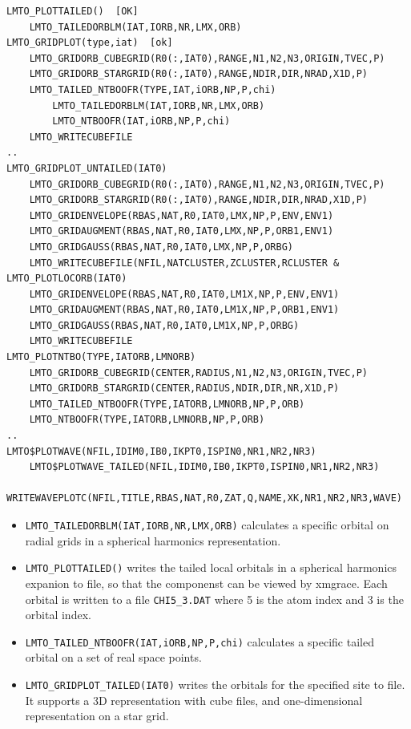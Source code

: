 \documentclass[11pt,a4paper]{report}
\begin{document}
\begin{verbatim}
LMTO_PLOTTAILED()  [OK]
    LMTO_TAILEDORBLM(IAT,IORB,NR,LMX,ORB)
LMTO_GRIDPLOT(type,iat)  [ok]
    LMTO_GRIDORB_CUBEGRID(R0(:,IAT0),RANGE,N1,N2,N3,ORIGIN,TVEC,P)
    LMTO_GRIDORB_STARGRID(R0(:,IAT0),RANGE,NDIR,DIR,NRAD,X1D,P)
    LMTO_TAILED_NTBOOFR(TYPE,IAT,iORB,NP,P,chi)
        LMTO_TAILEDORBLM(IAT,IORB,NR,LMX,ORB)
        LMTO_NTBOOFR(IAT,iORB,NP,P,chi)
    LMTO_WRITECUBEFILE
..
LMTO_GRIDPLOT_UNTAILED(IAT0)
    LMTO_GRIDORB_CUBEGRID(R0(:,IAT0),RANGE,N1,N2,N3,ORIGIN,TVEC,P)
    LMTO_GRIDORB_STARGRID(R0(:,IAT0),RANGE,NDIR,DIR,NRAD,X1D,P)
    LMTO_GRIDENVELOPE(RBAS,NAT,R0,IAT0,LMX,NP,P,ENV,ENV1)
    LMTO_GRIDAUGMENT(RBAS,NAT,R0,IAT0,LMX,NP,P,ORB1,ENV1)
    LMTO_GRIDGAUSS(RBAS,NAT,R0,IAT0,LMX,NP,P,ORBG)
    LMTO_WRITECUBEFILE(NFIL,NATCLUSTER,ZCLUSTER,RCLUSTER &
LMTO_PLOTLOCORB(IAT0)
    LMTO_GRIDENVELOPE(RBAS,NAT,R0,IAT0,LM1X,NP,P,ENV,ENV1)
    LMTO_GRIDAUGMENT(RBAS,NAT,R0,IAT0,LM1X,NP,P,ORB1,ENV1)
    LMTO_GRIDGAUSS(RBAS,NAT,R0,IAT0,LM1X,NP,P,ORBG)
    LMTO_WRITECUBEFILE
LMTO_PLOTNTBO(TYPE,IATORB,LMNORB)
    LMTO_GRIDORB_CUBEGRID(CENTER,RADIUS,N1,N2,N3,ORIGIN,TVEC,P)
    LMTO_GRIDORB_STARGRID(CENTER,RADIUS,NDIR,DIR,NR,X1D,P)
    LMTO_TAILED_NTBOOFR(TYPE,IATORB,LMNORB,NP,P,ORB)
    LMTO_NTBOOFR(TYPE,IATORB,LMNORB,NP,P,ORB)
..
LMTO$PLOTWAVE(NFIL,IDIM0,IB0,IKPT0,ISPIN0,NR1,NR2,NR3)
    LMTO$PLOTWAVE_TAILED(NFIL,IDIM0,IB0,IKPT0,ISPIN0,NR1,NR2,NR3)
        WRITEWAVEPLOTC(NFIL,TITLE,RBAS,NAT,R0,ZAT,Q,NAME,XK,NR1,NR2,NR3,WAVE)
\end{verbatim}






\begin{itemize}
\item \verb|LMTO_TAILEDORBLM(IAT,IORB,NR,LMX,ORB)| calculates a
  specific orbital on radial grids in a spherical harmonics
  representation.
%
\item \verb|LMTO_PLOTTAILED()| writes the tailed local orbitals in a
  spherical harmonics expanion to file, so that the componenst can be
  viewed by xmgrace. Each orbital is written to a file \verb|CHI5_3.DAT|
  where 5 is the atom index and 3 is the orbital index.
%
\item \verb|LMTO_TAILED_NTBOOFR(IAT,iORB,NP,P,chi)| calculates a
  specific tailed orbital on a set of real space points.
%
\item \verb|LMTO_GRIDPLOT_TAILED(IAT0)| writes the orbitals for the
  specified site to file. It supports a 3D representation with cube
  files, and one-dimensional representation on a star grid.
\end{itemize}
\end{document}
